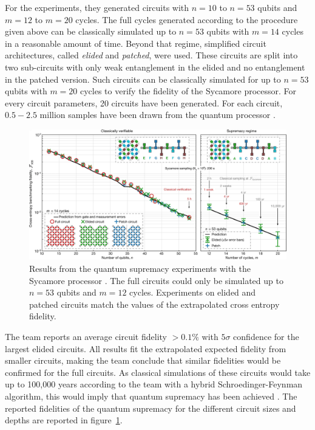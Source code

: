 For the experiments, they generated circuits with $n=10$ to $n=53$ qubits and
$m=12$ to $m=20$ cycles. The full cycles generated according to the procedure
given above can be classically simulated up to $n=53$ qubits with $m=14$ cycles
in a reasonable amount of time. Beyond that regime, simplified circuit
architectures, called \textit{elided} and \textit{patched}, were used. These circuits
are split into two sub-circuits with only weak entanglement in the elided and no
entanglement in the patched version. Such circuits can be classically simulated for up to $n=53$ qubits with $m=20$ cycles to
verify the fidelity of the Sycamore processor. For every circuit parameters, 20
circuits have been generated. For each circuit, $0.5-2.5$ million samples have been drawn
from the quantum processor \cite{martines2019supremacy}.

\begin{figure}[H]
  \centering
  \label{fig:supremacy_results}
  \includegraphics[width=\textwidth]{figures/supremacy_results}
  \caption[Cross Entropy Fidelity of the Sycamore Processor]{Results from the quantum supremacy experiments 
  with the Sycamore processor \cite{martines2019supremacy}. The full circuits could only be simulated up to $n=53$ qubits and 
  $m=12$ cycles. Experiments on elided and patched circuits match the values of the extrapolated cross entropy fidelity.}
\end{figure}

The team reports an average circuit fidelity $ > 0.1\%$ with $5\sigma$ confidence
for the largest elided circuits. All results fit the extrapolated expected
fidelity from smaller circuits, making the team conclude that similar fidelities
would be confirmed for the full circuits. As classical simulations of these
circuits would take up to 100,000 years according to the team with a hybrid
Schroedinger-Feynman algorithm, this would imply
that quantum supremacy has been achieved \cite{martines2019supremacy}. The reported fidelities of the quantum supremacy for
the different circuit sizes and depths are reported in figure~\ref{fig:supremacy_results}.

